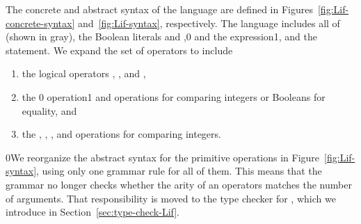 \documentclass[7x10,nocrop]{TimesAPriori_MIT}%
\def\racketEd{0}
\def\pythonEd{1}
\def\edition{0}
\newcommand{\racket}[1]{{\if\edition\racketEd{#1}\fi}}
\newcommand{\python}[1]{{\if\edition\pythonEd #1\fi}}
\begin{document}
The concrete and abstract syntax of the \LangIf{} language are defined in
Figures~\ref{fig:Lif-concrete-syntax} and~\ref{fig:Lif-syntax},
respectively. The \LangIf{} language includes all of 
\LangVar{} {(shown in gray)}, the Boolean literals \TRUE{} and
\FALSE{},\racket{ and} the  expression\python{, and the
  \code{if}  statement}. We expand the set of operators to include
\begin{enumerate}
\item the logical operators , , and ,
\item the \racket{ operation}\python{\key{==} and \key{!=} operations}
  for comparing integers or Booleans for equality, and
\item the \key{<}, \key{<=}, \key{>}, and \key{>=} operations for
  comparing integers.
\end{enumerate}

\racket{We reorganize the abstract syntax for the primitive
  operations in Figure~\ref{fig:Lif-syntax}, using only one grammar
  rule for all of them. This means that the grammar no longer checks
  whether the arity of an operators matches the number of
  arguments. That responsibility is moved to the type checker for
  \LangIf{}, which we introduce in Section~\ref{sec:type-check-Lif}.}


\newcommand{\LifGrammarRacket}{
  \begin{array}{lcl}
   \Type &::=& \key{Boolean} \\
    \itm{bool} &::=& \TRUE \MID \FALSE \\  
    \itm{cmp} &::= & \key{eq?} \MID \key{<} \MID \key{<=} \MID \key{>} \MID \key{>=} \\
    \Exp &::=& \itm{bool}
        \MID (\key{and}\;\Exp\;\Exp) \MID (\key{or}\;\Exp\;\Exp)
        \MID (\key{not}\;\Exp) \\
        &\MID& (\itm{cmp}\;\Exp\;\Exp) \MID \CIF{\Exp}{\Exp}{\Exp} 
  \end{array}
}
\newcommand{\LifASTRacket}{
\begin{array}{lcl}
   \Type &::=& \key{Boolean} \\
  \itm{bool} &::=& \code{\#t} \MID \code{\#f} \\
  \itm{cmp} &::= & \code{eq?} \MID \code{<} \MID \code{<=} \MID \code{>} \MID \code{>=} \\
  \itm{op} &::= & \itm{cmp} \MID \code{and} \MID \code{or} \MID \code{not} \\
  \Exp &::=& \BOOL{\itm{bool}} \MID \IF{\Exp}{\Exp}{\Exp} 
\end{array}
}
\newcommand{\LintOpAST}{
  \begin{array}{rcl}
    \itm{op} &::= & \code{read} \MID \code{+} \MID \code{-}\\
    \Exp{} &::=& \INT{\Int} \MID \PRIM{\itm{op}}{\Exp\ldots}    
  \end{array}
}
\end{document}
